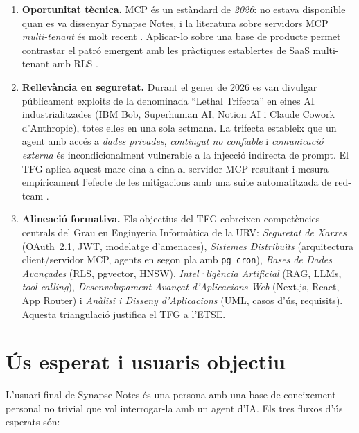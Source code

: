 \begin{enumerate}
  \item \textbf{Oportunitat tècnica.} MCP és un estàndard de
    \emph{2026}: no estava disponible quan es va dissenyar Synapse Notes,
    i la literatura sobre servidors MCP \emph{multi-tenant} és molt
    recent \autocite{aws2026mcp,gitguardian2026oauth}. Aplicar-lo sobre
    una base de producte permet contrastar el patró emergent amb les
    pràctiques establertes de SaaS multi-tenant amb RLS
    \autocite{supabase2026rag,tigerdata2026multitenant,nile2026multitenant}.

  \item \textbf{Rellevància en seguretat.} Durant el gener de 2026 es
    van divulgar públicament exploits de la denominada ``Lethal
    Trifecta'' \autocite{willison2025trifecta} en eines AI
    industrialitzades (IBM Bob, Superhuman AI, Notion AI i Claude
    Cowork d'Anthropic), totes elles en una sola setmana. La trifecta
    estableix que un agent amb accés a \emph{dades privades},
    \emph{contingut no confiable} i \emph{comunicació externa} és
    incondicionalment vulnerable a la injecció indirecta de prompt. El
    TFG aplica aquest marc eina a eina al servidor MCP resultant i
    mesura empíricament l'efecte de les mitigacions amb una suite
    automatitzada de red-team \autocite{promptfoo2026trifecta}.

  \item \textbf{Alineació formativa.} Els objectius del TFG cobreixen
    competències centrals del Grau en Enginyeria Informàtica de la
    URV: \emph{Seguretat de Xarxes} (OAuth~2.1, JWT, modelatge
    d'amenaces), \emph{Sistemes Distribuïts} (arquitectura
    client/servidor MCP, agents en segon pla amb \texttt{pg\_cron}),
    \emph{Bases de Dades Avançades} (RLS, pgvector, HNSW),
    \emph{Intel·ligència Artificial} (RAG, LLMs, \emph{tool calling}),
    \emph{Desenvolupament Avançat d'Aplicacions Web} (Next.js, React,
    App Router) i \emph{Anàlisi i Disseny d'Aplicacions} (UML, casos
    d'ús, requisits). Aquesta triangulació justifica el TFG a l'ETSE.
\end{enumerate}

\section{Ús esperat i usuaris objectiu}
\label{sec:usuaris}

L'usuari final de Synapse Notes és una persona amb una base de
coneixement personal no trivial que vol interrogar-la amb un agent
d'IA. Els tres fluxos d'ús esperats són:

